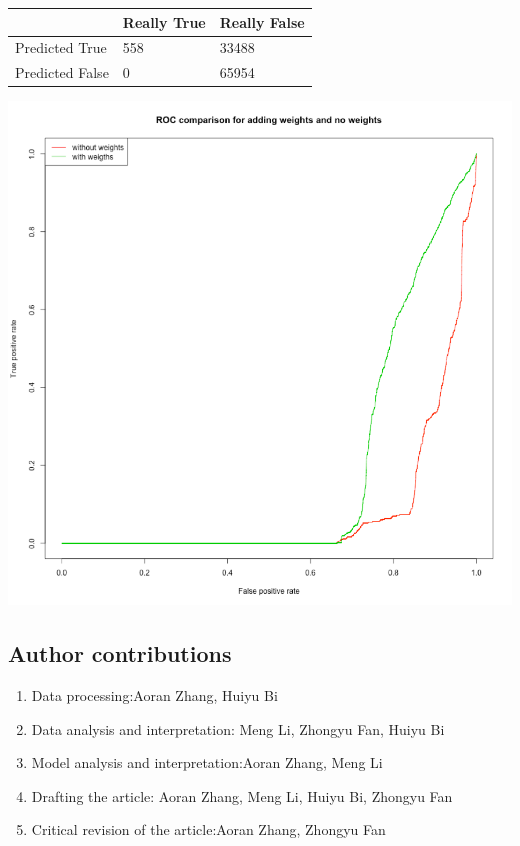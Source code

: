 \documentclass{article}
\begin{document}
\begin{spacing}{1}
\begin{large}
\vspace{5mm}
\begin{tabular}{| l | l | l |}
	\hline
	& Really True & Really False \\ \hline
	Predicted True & 558 & 33488 \\ \hline
	Predicted False & 0 & 65954\\
	\hline
\end{tabular}
\vspace{5mm}

\includegraphics[scale = 0.8]{ROCwithandwithoutweights.png}

\subsection{Author contributions}
\begin{enumerate}
	\item
	Data processing:Aoran Zhang, Huiyu Bi
	\item
	Data analysis and interpretation: Meng Li, Zhongyu Fan, Huiyu Bi
	\item
	Model analysis and interpretation:Aoran Zhang, Meng Li
	\item
	Drafting the article: Aoran Zhang, Meng Li, Huiyu Bi, Zhongyu Fan
	\item
	Critical revision of the article:Aoran Zhang, Zhongyu Fan


\end{enumerate}
\end{large}
\end{spacing}
\end{document}
